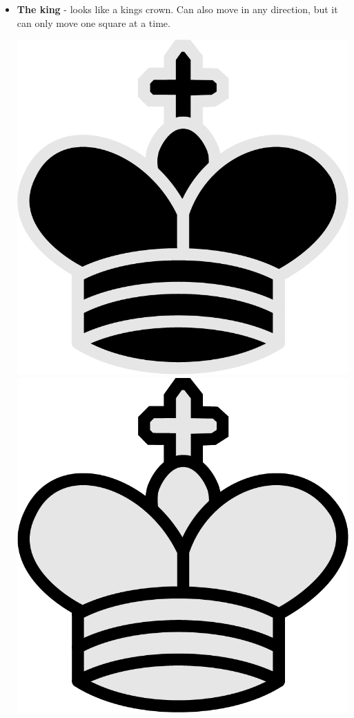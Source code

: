 \documentclass{article}
\begin{document}
\begin{itemize}
    \item \textbf{The king} - looks like a kings crown. Can also move in any direction, but it can only move one square at a time. \\
    \begin{center}
    	\includegraphics[scale=0.1]{image9.png}
    	\includegraphics[scale=0.1]{image8.png}
    \end{center}


\end{itemize}
\end{document}
